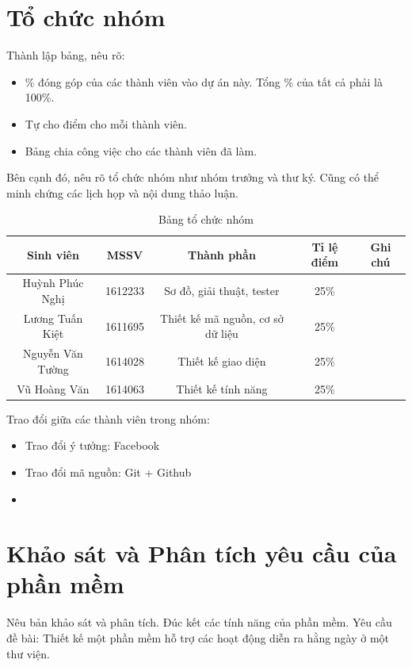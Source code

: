 \documentclass[a4paper]{article}
\begin{document}
\newpage
\thispagestyle{empty}
\listoftables

\newpage
\thispagestyle{empty}
\listoffigures

\newpage

\section{Tổ chức nhóm}
	
	Thành lập bảng, nêu rõ:
	\begin{itemize}
		\item \% đóng góp của các thành viên vào dự án này. Tổng \% của tất cả phải là 100\%.
		\item Tự cho điểm cho mỗi thành viên.
		\item Bảng chia công việc cho các thành viên đã làm.
	\end{itemize}
	
	Bên cạnh đó, nêu rõ tổ chức nhóm như nhóm trưởng và thư ký. Cũng có thể minh chứng các lịch họp và nội dung thảo luận.

	\begin{table}[!h]
		\begin{center}
			\begin{tabular}{|c|c|c|c|c|}
				\hline 
				Sinh viên & MSSV & Thành phần & Tỉ lệ điểm & Ghi chú \\ 
				\hline 
		   	 	Huỳnh Phúc Nghị & 1612233 & Sơ đồ, giải thuật, tester & 25\%&   \\ 
			    \hline 
			    Lương Tuấn Kiệt & 1611695 & Thiết kế mã nguồn, cơ sở dữ liệu & 25\%&  \\ 
				\hline 
				Nguyễn Văn Tường & 1614028 & Thiết kế giao diện & 25\% &\\ 
				\hline 
				Vũ Hoàng Văn & 1614063 & Thiết kế tính năng & 25\% &\\ 
				\hline 
			\end{tabular} 
			\caption{Bảng tổ chức nhóm}
		\end{center}
	\end{table}
	Trao đổi giữa các thành viên trong nhóm:	
	\begin{itemize}
	\item Trao đổi ý tưởng: Facebook
	\item Trao đổi mã nguồn: Git + Github
	\item 
	\end{itemize}
\newpage
\section{Khảo sát và Phân tích yêu cầu của phần mềm}
Nêu bản khảo sát và phân tích.
Đúc kết các tính năng của phần mềm.
Yêu cầu đề bài: Thiết kế một phần mềm hỗ trợ các hoạt động diễn ra hằng ngày ở một thư viện.
\end{document}
